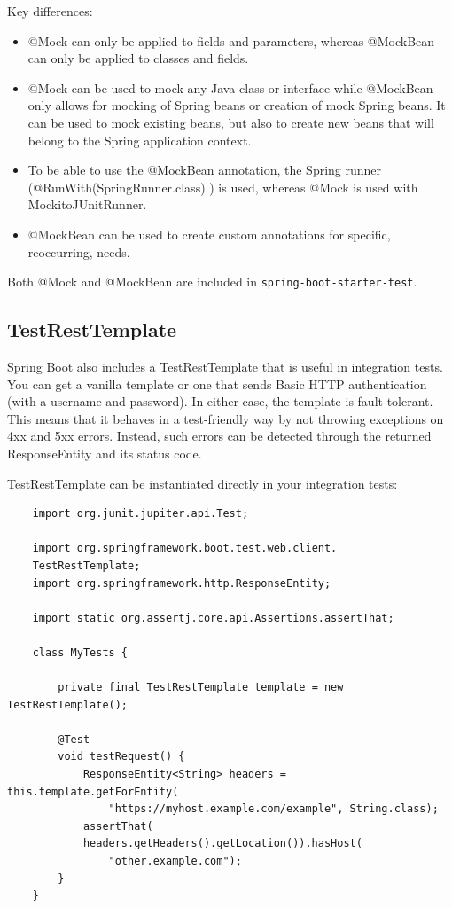 \documentclass{scrartcl}
\begin{document}
Key differences:

\begin{itemize}
    \item @Mock can only be applied to fields and parameters, whereas @MockBean can only be applied to classes and fields.
    \item @Mock can be used to mock any Java class or interface while @MockBean only allows for mocking of Spring beans or creation of mock Spring beans. It can be used to mock existing beans, but also to create new beans that will belong to the Spring application context.
    \item To be able to use the @MockBean annotation, the Spring runner (@RunWith(SpringRunner.class) ) is used, whereas @Mock is used with MockitoJUnitRunner.
    \item @MockBean can be used to create custom annotations for specific, reoccurring, needs.
\end{itemize}

Both @Mock and @MockBean are included in \lstinline|spring-boot-starter-test|.





\subsection{TestRestTemplate}

Spring Boot also includes a TestRestTemplate that is useful in integration tests. You can get a vanilla template or one that sends Basic HTTP authentication (with a username and password). In either case, the template is fault tolerant. This means that it behaves in a test-friendly way by not throwing exceptions on 4xx and 5xx errors. Instead, such errors can be detected through the returned ResponseEntity and its status code.

TestRestTemplate can be instantiated directly in your integration tests:

\begin{lstlisting}
    import org.junit.jupiter.api.Test;

    import org.springframework.boot.test.web.client.
    TestRestTemplate;
    import org.springframework.http.ResponseEntity;

    import static org.assertj.core.api.Assertions.assertThat;

    class MyTests {

        private final TestRestTemplate template = new TestRestTemplate();

        @Test
        void testRequest() {
            ResponseEntity<String> headers = this.template.getForEntity(
                "https://myhost.example.com/example", String.class);
            assertThat(
            headers.getHeaders().getLocation()).hasHost(
                "other.example.com");
        }
    }
\end{lstlisting}
\end{document}
